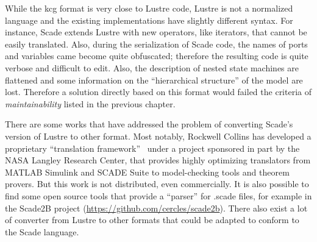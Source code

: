 \documentclass{template/openetcs_report}
\begin{document}
While the kcg format is very close to Lustre code, Lustre is not a
normalized language and the existing implementations have slightly
different syntax. For instance, Scade extends Lustre with new
operators, like iterators, that cannot be easily translated. Also,
during the serialization of Scade code, the names of ports and
variables came become quite obfuscated; therefore the resulting code
is quite verbose and difficult to edit. Also, the description of
nested state machines are flattened and some information on the
``hierarchical structure'' of the model are lost. Therefore a solution
directly based on this format would failed the criteria of
\emph{maintainability} listed in the previous chapter.

There are some works that have addressed the problem of converting
Scade's version of Lustre to other format. Most notably, Rockwell
Collins has developed a proprietary ``translation
framework''~\cite{whalen07} under a project sponsored in part by the
NASA Langley Research Center, that provides highly optimizing
translators from MATLAB Simulink and SCADE Suite to model-checking
tools and theorem provers. But this work is not distributed, even
commercially. It is also possible to find some open source tools that
provide a ``parser'' for .scade files, for example in the Scade2B
project (\url{https://github.com/cercles/scade2b}). There also exist a
lot of converter from Lustre to other formats that could be adapted to
conform to the Scade language.


\begin{center}
  \setlength{\fboxsep}{10pt}
\end{center}
\end{document}

